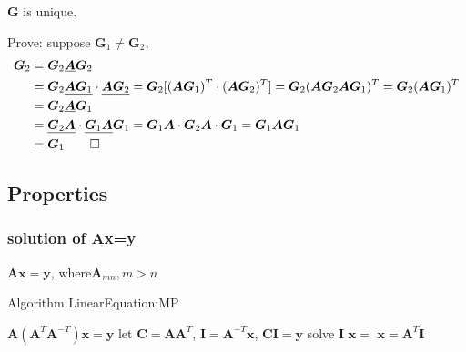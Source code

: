 \documentclass[UTF8]{../../09-Mathematics}
\begin{document}
\begin{lemma}
    $\boldsymbol G$ is unique.
    
    Prove: suppose $\boldsymbol G_1 \neq \boldsymbol G_2$,
    $$
    \begin{aligned}
        \boldsymbol G_2 &= \boldsymbol G_2 \underline{\boldsymbol A}  \boldsymbol G_2\\
        &= \boldsymbol G_2 \underline{\boldsymbol A \boldsymbol G_1} \cdot \underline{\boldsymbol A \boldsymbol G_2} = \boldsymbol G_2 [(\boldsymbol A \boldsymbol G_1)^T \cdot (\boldsymbol A \boldsymbol G_2)^T] = \boldsymbol G_2(\boldsymbol A \boldsymbol G_2\boldsymbol A \boldsymbol G_1)^T= \boldsymbol G_2(\boldsymbol A  \boldsymbol G_1)^T\\
        &= \boldsymbol G_2 \underline{\boldsymbol A}  \boldsymbol G_1\\
        &=\underline{\boldsymbol G_2 \boldsymbol A} \cdot \underline{\boldsymbol G_1 \boldsymbol A } \boldsymbol G_1 =\boldsymbol G_1 \boldsymbol A \cdot \boldsymbol G_2 \boldsymbol A  \cdot \boldsymbol G_1=\boldsymbol G_1 \boldsymbol A \boldsymbol G_1\\
        &= \boldsymbol G_1 \qed
    \end{aligned}
    $$

\end{lemma}



\subsection{Properties}

\subsubsection{solution of Ax=y}
$\boldsymbol A \boldsymbol x = \boldsymbol y$, where$\boldsymbol A_{mn},m>n$


\begin{algorithm}[H]
    \caption{Algorithm LinearEquation:MP}\label{algo:LinearEquation:MP}
    \SetAlgoLined
    $\boldsymbol A (\boldsymbol A^T \boldsymbol A^{-T}) \boldsymbol x = \boldsymbol y$\;
    let $\boldsymbol C = \boldsymbol A \boldsymbol A^T$, $\boldsymbol I = \boldsymbol A^{-T} \boldsymbol x$, $\boldsymbol C \boldsymbol I = \boldsymbol y$\;
    solve $\boldsymbol I$\;
    $\boldsymbol x = $\;
    \KwRet $\boldsymbol x = \boldsymbol A^T \boldsymbol I$\;
\end{algorithm}
\end{document}
